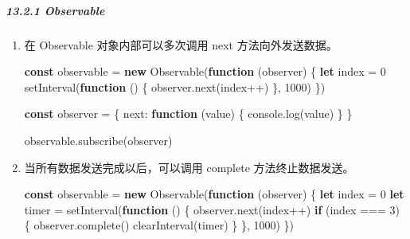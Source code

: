 \documentclass[
]{article}
\newenvironment{Shaded}{}{}
\newcommand{\BuiltInTok}[1]{#1}
\newcommand{\ControlFlowTok}[1]{\textcolor[rgb]{0.00,0.44,0.13}{\textbf{#1}}}
\newcommand{\DataTypeTok}[1]{\textcolor[rgb]{0.56,0.13,0.00}{#1}}
\newcommand{\DecValTok}[1]{\textcolor[rgb]{0.25,0.63,0.44}{#1}}
\newcommand{\FunctionTok}[1]{\textcolor[rgb]{0.02,0.16,0.49}{#1}}
\newcommand{\KeywordTok}[1]{\textcolor[rgb]{0.00,0.44,0.13}{\textbf{#1}}}
\newcommand{\NormalTok}[1]{#1}
\newcommand{\OperatorTok}[1]{\textcolor[rgb]{0.40,0.40,0.40}{#1}}
\newcommand{\PreprocessorTok}[1]{\textcolor[rgb]{0.74,0.48,0.00}{#1}}
\begin{document}
\hypertarget{1321-observable}{%
\subparagraph{13.2.1 Observable}\label{1321-observable}}

\begin{enumerate}
\def\labelenumi{\arabic{enumi}.}
\item
  在 Observable 对象内部可以多次调用 next 方法向外发送数据。

\begin{Shaded}
\begin{Highlighting}[]
\KeywordTok{const}\NormalTok{ observable }\OperatorTok{=} \KeywordTok{new} \FunctionTok{Observable}\NormalTok{(}\KeywordTok{function}\NormalTok{ (observer) \{}
  \KeywordTok{let}\NormalTok{ index }\OperatorTok{=} \DecValTok{0}
  \PreprocessorTok{setInterval}\NormalTok{(}\KeywordTok{function}\NormalTok{ () \{}
\NormalTok{    observer}\OperatorTok{.}\FunctionTok{next}\NormalTok{(index}\OperatorTok{++}\NormalTok{)}
\NormalTok{  \}}\OperatorTok{,} \DecValTok{1000}\NormalTok{)}
\NormalTok{\})}

\KeywordTok{const}\NormalTok{ observer }\OperatorTok{=}\NormalTok{ \{}
  \DataTypeTok{next}\OperatorTok{:} \KeywordTok{function}\NormalTok{ (value) \{}
    \BuiltInTok{console}\OperatorTok{.}\FunctionTok{log}\NormalTok{(value)}
\NormalTok{  \}}
\NormalTok{\}}

\NormalTok{observable}\OperatorTok{.}\FunctionTok{subscribe}\NormalTok{(observer)}
\end{Highlighting}
\end{Shaded}
\item
  当所有数据发送完成以后，可以调用 complete 方法终止数据发送。

\begin{Shaded}
\begin{Highlighting}[]
\KeywordTok{const}\NormalTok{ observable }\OperatorTok{=} \KeywordTok{new} \FunctionTok{Observable}\NormalTok{(}\KeywordTok{function}\NormalTok{ (observer) \{}
  \KeywordTok{let}\NormalTok{ index }\OperatorTok{=} \DecValTok{0}
  \KeywordTok{let}\NormalTok{ timer }\OperatorTok{=} \PreprocessorTok{setInterval}\NormalTok{(}\KeywordTok{function}\NormalTok{ () \{}
\NormalTok{    observer}\OperatorTok{.}\FunctionTok{next}\NormalTok{(index}\OperatorTok{++}\NormalTok{)}
    \ControlFlowTok{if}\NormalTok{ (index }\OperatorTok{===} \DecValTok{3}\NormalTok{) \{}
\NormalTok{      observer}\OperatorTok{.}\FunctionTok{complete}\NormalTok{()}
      \PreprocessorTok{clearInterval}\NormalTok{(timer)}
\NormalTok{    \}}
\NormalTok{  \}}\OperatorTok{,} \DecValTok{1000}\NormalTok{)}
\NormalTok{\})}


\end{Highlighting}
\end{Shaded}
\end{enumerate}
\end{document}
